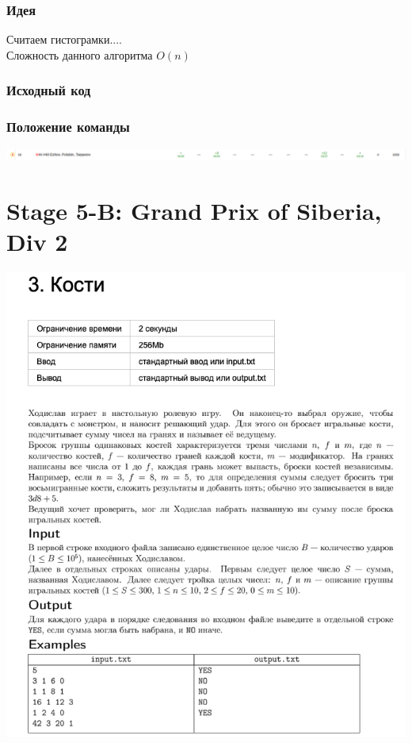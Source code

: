 \documentclass[12pt]{article}
\begin{document}
\subsubsection*{Идея}
Считаем гистограмки....
\\ 
Сложность данного алгоритма $O(n)$
\subsubsection*{Исходный код}

\subsubsection*{Положение команды}
\includegraphics[scale=0.5]{images/4.png}\newline\noindent

\pagebreak
\section{Stage 5-B: Grand Prix of Siberia, Div 2}
\includegraphics[scale=0.75]{statements/5_3.png}
\end{document}
